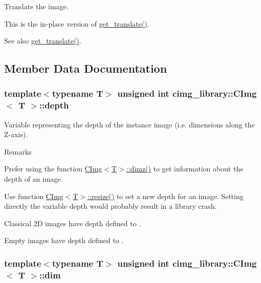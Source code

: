 Translate the image. 

This is the in-\/place version of \hyperlink{structcimg__library_1_1_c_img_af8c9f6ca06e378ada0bfd7516ae4b69d}{get\_\-translate()}. \begin{DoxySeeAlso}{See also}
\hyperlink{structcimg__library_1_1_c_img_af8c9f6ca06e378ada0bfd7516ae4b69d}{get\_\-translate()}. 
\end{DoxySeeAlso}


\subsection{Member Data Documentation}
\hypertarget{structcimg__library_1_1_c_img_a982d5d1e153477adf7f851106fe8ee3a}{
\subsubsection[{depth}]{\setlength{\rightskip}{0pt plus 5cm}template$<$typename T$>$ unsigned int {\bf cimg\_\-library::CImg}$<$ T $>$::{\bf depth}}}
\label{structcimg__library_1_1_c_img_a982d5d1e153477adf7f851106fe8ee3a}


Variable representing the depth of the instance image (i.e. dimensions along the Z-\/axis). 

\begin{DoxyRemark}{Remarks}

\begin{DoxyItemize}
\item Prefer using the function \hyperlink{structcimg__library_1_1_c_img_aba56e96a615d71ed9a71009768fc4b75}{CImg$<$T$>$::dimz()} to get information about the depth of an image.
\item Use function \hyperlink{structcimg__library_1_1_c_img_a84970d569f01fc5f9370d9cc84428903}{CImg$<$T$>$::resize()} to set a new depth for an image. Setting directly the variable {\ttfamily depth} would probably result in a library crash.
\item Classical 2D images have {\ttfamily depth} defined to {}.
\item Empty images have {\ttfamily depth} defined to {}. 
\end{DoxyItemize}
\end{DoxyRemark}
\hypertarget{structcimg__library_1_1_c_img_ac9648dfe0a26d58e6e0030a3dbca234e}{
\subsubsection[{dim}]{\setlength{\rightskip}{0pt plus 5cm}template$<$typename T$>$ unsigned int {\bf cimg\_\-library::CImg}$<$ T $>$::{\bf dim}}}
\label{structcimg__library_1_1_c_img_ac9648dfe0a26d58e6e0030a3dbca234e}


